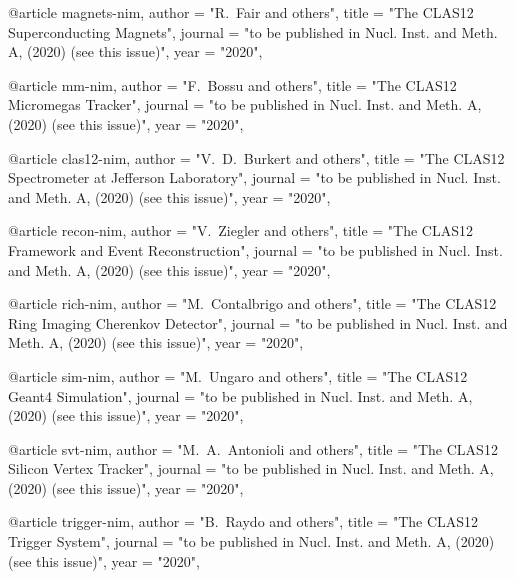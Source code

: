 @article{
magnets-nim,
author         = "R.~Fair and others",
title          = "{The CLAS12 Superconducting Magnets}",
journal        = "to be published in Nucl. Inst. and Meth. A, (2020) (see this issue)",
year           = "2020",
}

@article{
mm-nim,
author         = "F.~Bossu and others",
title          = "{The CLAS12 Micromegas Tracker}",
journal        = "to be published in Nucl. Inst. and Meth. A, (2020) (see this issue)",
year           = "2020",
}

@article{
clas12-nim,
author         = "V.~D.~Burkert and others",
title          = "{The CLAS12 Spectrometer at Jefferson Laboratory}",
journal        = "to be published in Nucl. Inst. and Meth. A, (2020) (see this issue)",
year           = "2020",
}

@article{
recon-nim,
author         = "V.~Ziegler and others",
title          = "{The CLAS12 Framework and Event Reconstruction}",
journal        = "to be published in Nucl. Inst. and Meth. A, (2020) (see this issue)",
year           = "2020",
}

@article{
rich-nim,
author         = "M.~Contalbrigo and others",
title          = "{The CLAS12 Ring Imaging Cherenkov Detector}",
journal        = "to be published in Nucl. Inst. and Meth. A, (2020) (see this issue)",
year           = "2020",
}

@article{
sim-nim,
author         = "M.~Ungaro and others",
title          = "{The CLAS12 Geant4 Simulation}",
journal        = "to be published in Nucl. Inst. and Meth. A, (2020) (see this issue)",
year           = "2020",
}

@article{
svt-nim,
author         = "M.~A.~Antonioli and others",
title          = "{The CLAS12 Silicon Vertex Tracker}",
journal        = "to be published in Nucl. Inst. and Meth. A, (2020) (see this issue)",
year           = "2020",
}

@article{
trigger-nim,
author         = "B.~Raydo and others",
title          = "{The CLAS12 Trigger System}",
journal        = "to be published in Nucl. Inst. and Meth. A, (2020) (see this issue)",
year           = "2020",
}

